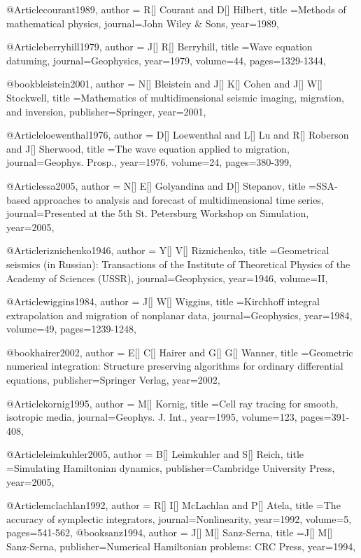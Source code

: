 {@Article{courant1989,
  author = {R[] Courant and D[] Hilbert},
  title ={Methods of mathematical physics},
  journal={John Wiley \& Sons},
  year=1989,
}

@Article{berryhill1979,
  author = {J[] R[] Berryhill},
  title ={Wave equation datuming},
  journal={Geophysics},
  year=1979,
  volume=44,
  pages={1329-1344},
}

@book{bleistein2001,
  author = {N[] Bleistein and J[] K[] Cohen and J[] W[] Stockwell},
  title ={Mathematics of multidimensional seismic imaging, migration, and inversion},
  publisher={Springer},
  year=2001,
}

@Article{loewenthal1976,
  author = {D[] Loewenthal and L[] Lu and R[] Roberson and J[] Sherwood},
  title ={The wave equation applied to migration},
  journal={Geophys. Prosp.},
  year=1976,
  volume=24,
  pages={380-399},
}

@Article{ssa2005,
  author = {N[] E[] Golyandina and D[] Stepanov},
  title ={SSA-based approaches to analysis and forecast of multidimensional time series},
  journal={Presented at the 5th St. Petersburg Workshop on Simulation},
  year=2005,
}



@Article{riznichenko1946,
  author = {Y[] V[] Riznichenko},
  title ={Geometrical seismics (in Russian): Transactions of the Institute of Theoretical Physics of the Academy of Sciences (USSR)},
  journal={Geophysics},
  year=1946,
  volume=II,
}

@Article{wiggins1984,
  author = {J[] W[] Wiggins},
  title ={Kirchhoff integral extrapolation and migration of nonplanar data},
  journal={Geophysics},
  year=1984,
  volume=49,
  pages={1239-1248},
}

@book{hairer2002,
  author = {E[] C[] Hairer and G[] G[] Wanner},
  title ={Geometric numerical integration: Structure preserving algorithms for ordinary differential equations},
  publisher={Springer Verlag},
  year=2002,
}

@Article{kornig1995,
  author = {M[] Kornig},
  title ={Cell ray tracing for smooth, isotropic media},
  journal={Geophys. J. Int.},
  year=1995,
  volume=123,
  pages={391-408},
}

@Article{leimkuhler2005,
  author = {B[] Leimkuhler and S[] Reich},
  title ={Simulating Hamiltonian dynamics},
  publisher={Cambridge University Press},
  year=2005,
}


@Article{mclachlan1992,
  author = {R[] I[] McLachlan and P[] Atela},
  title ={The accuracy of symplectic integrators},
  journal={Nonlinearity},
  year=1992,
  volume=5,
  pages={541-562},
}
@book{sanz1994,
  author = {J[] M[] Sanz-Serna},
  title ={J[] M[] Sanz-Serna},
  publisher={Numerical Hamiltonian problems: CRC Press},
  year=1994,
}

}
